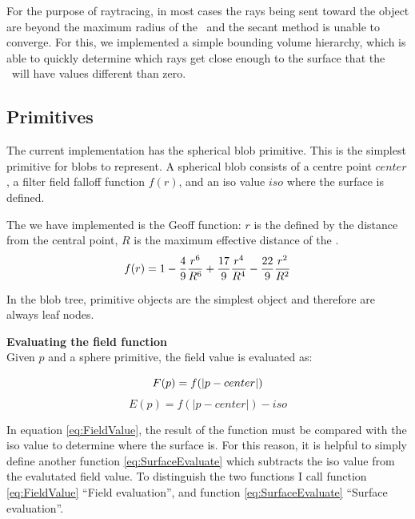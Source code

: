 \documentclass[conference]{acmsiggraph}
\begin{document}
For the purpose of raytracing, in most cases the rays being sent toward the
object are beyond the maximum radius of the \fff\ and the secant method is
unable to converge. For this, we implemented a simple bounding volume
hierarchy, which is able to quickly determine which rays get close enough to
the surface that the \fff\ will have values different than zero.

\subsection{Primitives}
The current implementation has the spherical blob primitive. This is the
simplest primitive for blobs to represent. A spherical blob consists of a
centre point $center$, a filter field falloff function $f(r)$, and an iso value
$iso$ where the surface is defined.

The \fff we have implemented is the Geoff function: $r$ is the defined by the
distance from the central point, $R$ is the maximum effective distance of the
\fff.
\begin{equation}
f(r) = 1 - {4\over9} {r^6 \over R^6} + {17 \over 9} {r^4 \over R ^ 4} -
{22\over 9} {r^2 \over R^2}
\label{eq:GeoffFunction}
\end{equation}

In the blob tree, primitive objects are the simplest object and therefore are
always leaf nodes.

\textbf{Evaluating the field function}\\
Given $p$ and a sphere primitive, the field value is evaluated as:

\begin{equation}
F(p) = f(\lvert p - center \rvert)\\
\label{eq:FieldValue}
\end{equation}
\begin{equation}
E(p) = f(\lvert p - center \rvert) - iso
\label{eq:SurfaceEvaluate}
\end{equation}



In equation \ref{eq:FieldValue}, the result of the function must be compared with
the iso value to determine where the surface is. For this reason, it is helpful
to simply define another function \ref{eq:SurfaceEvaluate} which subtracts the
iso value from the evalutated field value. To distinguish the two functions I
call function \ref{eq:FieldValue} ``Field evaluation'', and function
\ref{eq:SurfaceEvaluate} ``Surface evaluation''.
\end{document}
